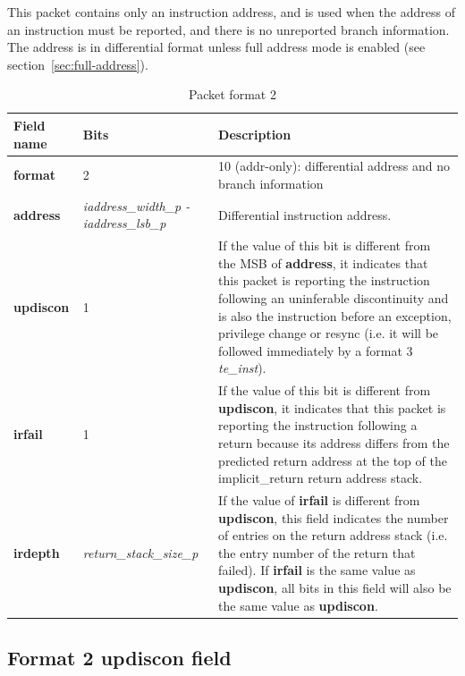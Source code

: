 This packet contains only an instruction address, and is used when the address of an instruction must be reported, 
and there is no unreported branch information.  The address is in differential format unless full address mode is
enabled (see section~\ref{sec:full-address}).

\begin{table}[!h]
  \centering
  \caption{Packet format 2}
  \label{tab:te_inst2}
  \begin{tabulary}{\textwidth}{|l|p{35mm}|p{90mm}|}
    \hline
    {\bf Field name} & {\bf Bits} & {\bf Description} \\
    \hline
    \textbf{format}	& 2	& 10 (addr-only): differential address and no branch information\\
    \hline
    \textbf{address} & \textit {iaddress\_width\_p - iaddress\_lsb\_p} & 
              Differential instruction address.\\ 
    \hline
    \textbf{updiscon}	& 1 & 
                If the value of this bit is different from the MSB of \textbf{address}, it indicates that this 
                packet is reporting the instruction following an uninferable discontinuity and is also the 
                instruction before an exception, privilege change or resync 
                (i.e. it will be followed immediately by a format 3 \textit{te\_inst}).\\
    \hline
    \textbf{irfail}	& 1 & 
                If the value of this bit is different from \textbf{updiscon}, it indicates that this
                packet is reporting the instruction following a return because its address differs from 
                the predicted return address at the top of the implicit\_return return address stack.\\
    \hline
    \textbf{irdepth}	& \textit {return\_stack\_size\_p} & 
                If the value of \textbf{irfail} is different from \textbf{updiscon}, this field indicates 
                the number of entries on the return address stack (i.e. the entry number of the return that
                failed).  If \textbf{irfail} is the same value as \textbf{updiscon}, all bits in this field 
                will also be the same value as \textbf{updiscon}. \\
    \hline
  \end{tabulary}
\end{table}

\subsection{Format 2 \textbf{updiscon} field} \label{sec:updiscon}

